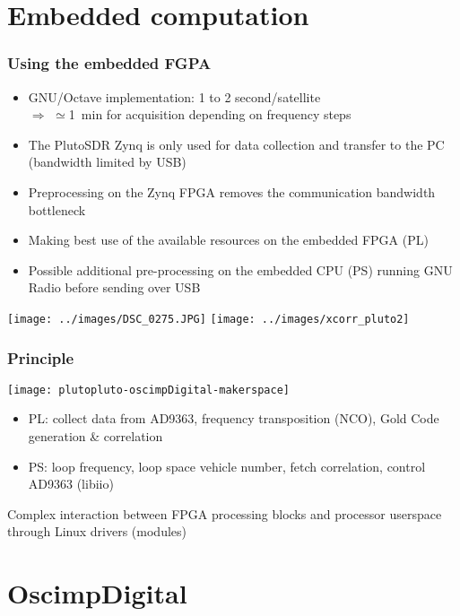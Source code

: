 \documentclass[compress,10pt]{beamer}
\begin{document}
\section{Embedded computation}
\begin{frame}[fragile]\frametitle{Using the embedded FGPA}

\begin{itemize}
\item
GNU/Octave implementation: 1 to 2 second/satellite \\
$\Rightarrow$ $\simeq$1~min for acquisition depending on frequency steps
\item The PlutoSDR Zynq is only used for data collection and transfer to the PC (bandwidth
limited by USB)
\item Preprocessing on the Zynq FPGA removes the communication bandwidth bottleneck
\item Making best use of the available resources on the embedded FPGA (PL)
\item Possible additional pre-processing on the embedded CPU (PS) running GNU Radio before sending
over USB
\end{itemize}

\texttt{[image: ../images/DSC\_0275.JPG]}
\texttt{[image: ../images/xcorr\_pluto2]}
\end{frame}

\begin{frame}[fragile]\frametitle{Principle}

\begin{center}
\texttt{[image: plutopluto-oscimpDigital-makerspace]}
\end{center}

\begin{itemize}
\item PL: collect data from AD9363, frequency transposition (NCO), Gold Code generation \& correlation
\item PS: loop frequency, loop space vehicle number, fetch correlation, control AD9363 (libiio)
\end{itemize}

Complex interaction between FPGA processing blocks and processor userspace through
Linux drivers (modules)
\end{frame}

\section{OscimpDigital}
\end{document}
